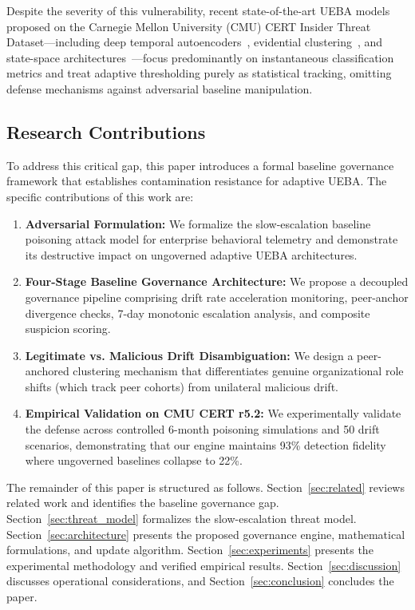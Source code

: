 \documentclass[conference]{IEEEtran}
\begin{document}
Despite the severity of this vulnerability, recent state-of-the-art UEBA models proposed on the Carnegie Mellon University (CMU) CERT Insider Threat Dataset---including deep temporal autoencoders~\cite{song2024britd}, evidential clustering~\cite{ali2025realtime}, and state-space architectures~\cite{kong2026mambaitd}---focus predominantly on instantaneous classification metrics and treat adaptive thresholding purely as statistical tracking, omitting defense mechanisms against adversarial baseline manipulation.

\subsection{Research Contributions}
To address this critical gap, this paper introduces a formal baseline governance framework that establishes contamination resistance for adaptive UEBA. The specific contributions of this work are:
\begin{enumerate}
    \item \textbf{Adversarial Formulation:} We formalize the slow-escalation baseline poisoning attack model for enterprise behavioral telemetry and demonstrate its destructive impact on ungoverned adaptive UEBA architectures.
    \item \textbf{Four-Stage Baseline Governance Architecture:} We propose a decoupled governance pipeline comprising drift rate acceleration monitoring, peer-anchor divergence checks, 7-day monotonic escalation analysis, and composite suspicion scoring.
    \item \textbf{Legitimate vs. Malicious Drift Disambiguation:} We design a peer-anchored clustering mechanism that differentiates genuine organizational role shifts (which track peer cohorts) from unilateral malicious drift.
    \item \textbf{Empirical Validation on CMU CERT r5.2:} We experimentally validate the defense across controlled 6-month poisoning simulations and 50 drift scenarios, demonstrating that our engine maintains 93\% detection fidelity where ungoverned baselines collapse to 22\%.
\end{enumerate}

The remainder of this paper is structured as follows. Section~\ref{sec:related} reviews related work and identifies the baseline governance gap. Section~\ref{sec:threat_model} formalizes the slow-escalation threat model. Section~\ref{sec:architecture} presents the proposed governance engine, mathematical formulations, and update algorithm. Section~\ref{sec:experiments} presents the experimental methodology and verified empirical results. Section~\ref{sec:discussion} discusses operational considerations, and Section~\ref{sec:conclusion} concludes the paper.
\end{document}
